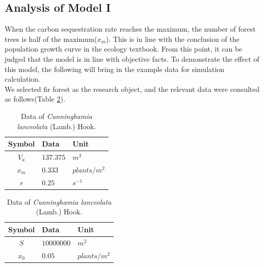 \documentclass[12pt]{article}
\begin{document}
\subsection{Analysis of Model I}
When the carbon sequestration rate reaches the maximum, the number of forest
trees is half of the maximum($x_m$). This is in line with the conclusion of the
population growth curve in the ecology textbook\cite{2009Ecology}. From this
point, it can be judged that the model is in line with objective facts. To
demonstrate the effect of this model, the following will bring in the example
data for simulation calculation.\\ We selected fir forest as the research
object, and the relevant data were consulted as follows(Table \ref{II1}).
\begin{table}[hp]
    \caption{Data of \textit{Cunninghamia lanceolata} (Lamb.) Hook.\cite{treedata1}}\label{II1}
    \centering
    \begin{tabular}[t]{c>{\centering}p{3cm}l}
        \toprule
        \textbf{Symbol} & \textbf{Data} & \textbf{Unit} \\
        \midrule
        $V_a$           & $137.375$     & $m^3$         \\
        \midrule
        $x_m$           & $0.333$       & $plants/m^2$  \\
        \midrule
        $r$             & $0.25$        & $s^{-1}$      \\
        \bottomrule
    \end{tabular}
    \qquad
    \begin{tabular}[t]{c>{\centering}p{3cm}l}
        \toprule
        \textbf{Symbol} & \textbf{Data}\footnotemark & \textbf{Unit} \\
        \midrule
        $S$             & $10000000$                 & $m^2$         \\
        \midrule
        $x_0$           & $0.05$                     & $plants/m^2$  \\
        \bottomrule
    \end{tabular}
\end{table}
\end{document}
